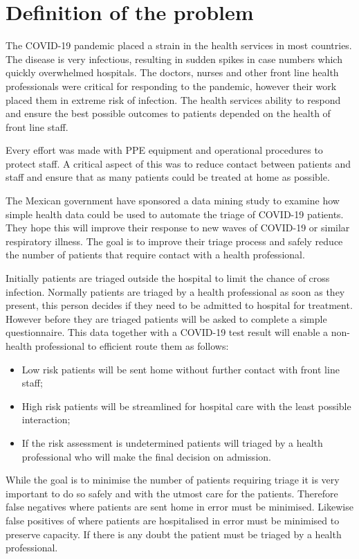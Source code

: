 \section{Definition of the problem}

The COVID-19 pandemic placed a strain in the health services in most countries. The disease is very 
infectious, resulting in sudden spikes in case numbers which quickly overwhelmed hospitals.
The doctors, nurses and other front line health professionals were critical for responding to the 
pandemic, however their work placed them in extreme risk of infection. The health services ability 
to respond and ensure the best possible outcomes to patients depended on the health of front line
staff.

Every effort was made with PPE equipment and operational procedures to protect staff. A critical
aspect of this was to reduce contact between patients and staff and ensure that as many patients
could be treated at home as possible.

The Mexican government have sponsored a data mining study to examine how simple health data could
be used to automate the triage of COVID-19 patients. They hope this will improve their response to
new waves of COVID-19 or similar respiratory illness. The goal is to improve their triage process
and safely reduce the number of patients that require contact with a health professional.

Initially patients are triaged outside the hospital to limit the chance of cross infection. Normally 
patients are triaged by a health professional as soon as they present, this person decides if they
need to be admitted to hospital for treatment. However before they are triaged
patients will be asked to complete a simple questionnaire. This data together with a COVID-19 test 
result will enable a non-health professional to efficient route them as follows:
 \begin{itemize}
     \item Low risk patients will be sent home without further contact with front line staff;
     \item High risk patients will be streamlined for hospital care with the least possible interaction;
     \item If the risk assessment is undetermined patients will triaged by a health professional who will
     make the final decision on admission.
 \end{itemize}

While the goal is to minimise the number of patients requiring triage it is very important to do so
safely and with the utmost care for the patients. Therefore false negatives where patients are
sent home in error must be minimised. Likewise false positives of where patients are hospitalised in
error must be minimised to preserve capacity. If there is any doubt the patient must be triaged by
a health professional.

